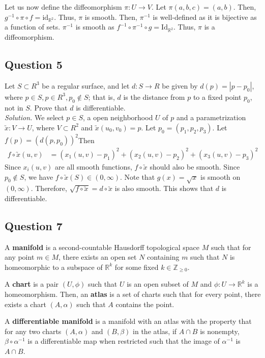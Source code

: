 \documentclass[12pt]{article}
\begin{document}
Let us now define the diffeomorphism 
$\pi : U \to V.$
Let $\pi (a, b, c) = (a, b).$ Then, $g^{-1}\circ\pi \circ f = \mathrm{id}_{\mathbb R^2}.$ Thus, $\pi$ is smooth.
Then, $\pi^{-1}$ is well-defined as it is bijective as a function of sets.
$\pi^{-1}$ is smooth as $f^{-1} \circ \pi^{-1} \circ g = \mathrm{Id}_{\mathbb R^2}.$ Thus, $\pi$ is a diffeomorphism.

\subsection*{Question 5}
Let $S \subset R^3$ be a regular surface, and let $d:S\to R$ be given by $d(p)=|p- p_0|$, where $p \in S, p \in R^3, p_0 \notin S$; that is, $d$ is the distance from $p$ to a fixed point $p_0$, not in $S$. Prove that $d$ is differentiable.\\

\textit{Solution.} We select $p\in S$, a open neighborhood $U$ of $p$ and a parametrization $\utilde{x}: V \to U$, where $V\subset R^2$ and $\utilde{x}(u_0,v_0) = p$. Let $p_0=(p_1,p_2,p_3)$. Let $f(p) = (d(p,p_0))^2$Then \begin{align*}
    f\circ\utilde{x}(u,v) &= (x_1(u,v)-p_1)^2+(x_2(u,v)-p_2)^2+(x_3(u,v)-p_3)^2
\end{align*}
Since $x_i(u,v)$ are all smooth functions, $f\circ \utilde{x}$ should also be smooth. Since $p_0\notin S$, we have $f\circ\utilde{x}(S)\in (0,\infty)$. Note that $g(x)=\sqrt{x}$ is smooth on $(0,\infty)$. Therefore, $\sqrt{f\circ\utilde{x}} = d\circ\utilde{x}$ is also smooth. This shows that $d$ is differentiable.

\subsection*{Question 7}

\begin{definition}
    A \textbf{manifold} is a second-countable Hausdorff topological space $M$ such that
    for any point $m \in M$, there exists an open set $N$ containing $m$ such that $N$ is homeomorphic to a subspace of $\mathbb R^k$ for some fixed $k \in \mathbb Z_{\geq 0}$.

    A \textbf{chart} is a pair $(U, \phi)$ such that $U$ is an open subset of $M$ and $\phi:U \to \mathbb R^k$
    is a homeomorphism. Then, an \textbf{atlas} is a set of charts such that for every point, there exists a chart
    $(A, \alpha)$ such that $A$ contains the point.

    A \textbf{differentiable manifold} is a manifold with an atlas with the property that
    for any two charts $(A, \alpha)$ and $(B, \beta)$ in the atlas, if $A\cap B$ is nonempty, $\beta\circ \alpha^{-1}$
    is a differentiable map when restricted such that the image of $\alpha^{-1}$ is $A\cap B$.
\end{definition}
\end{document}
